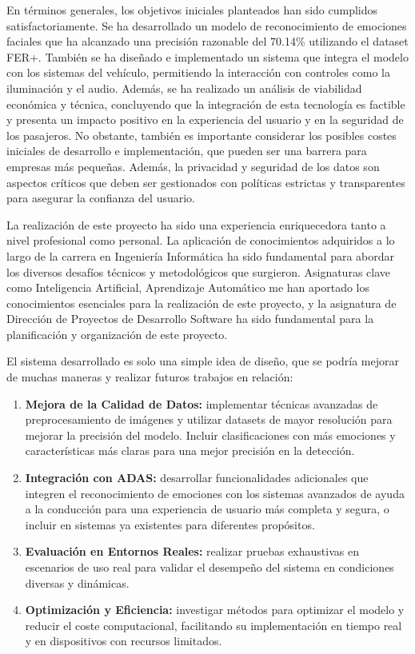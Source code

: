 \documentclass[12pt]{report} %
\begin{document}
En términos generales, los objetivos iniciales planteados han sido cumplidos satisfactoriamente. Se ha desarrollado un modelo de reconocimiento de emociones faciales que ha alcanzado una precisión razonable del 70.14\% utilizando el dataset FER+. También se ha diseñado e implementado un sistema que integra el modelo con los sistemas del vehículo, permitiendo la interacción con controles como la iluminación y el audio. Además, se ha realizado un análisis de viabilidad económica y técnica, concluyendo que la integración de esta tecnología es factible y presenta un impacto positivo en la experiencia del usuario y en la seguridad de los pasajeros. No obstante, también es importante considerar los posibles costes iniciales de desarrollo e implementación, que pueden ser una barrera para empresas más pequeñas. Además, la privacidad y seguridad de los datos son aspectos críticos que deben ser gestionados con políticas estrictas y transparentes para asegurar la confianza del usuario.

La realización de este proyecto ha sido una experiencia enriquecedora tanto a nivel profesional como personal. La aplicación de conocimientos adquiridos a lo largo de la carrera en Ingeniería Informática ha sido fundamental para abordar los diversos desafíos técnicos y metodológicos que surgieron. Asignaturas clave como Inteligencia Artificial, Aprendizaje Automático me han aportado los conocimientos esenciales para la realización de este proyecto, y la asignatura de Dirección de Proyectos de Desarrollo Software ha sido fundamental para la planificación y organización de este proyecto.

El sistema desarrollado es solo una simple idea de diseño, que se podría mejorar de muchas maneras y realizar futuros trabajos en relación:

\begin{enumerate}

    \item \textbf{Mejora de la Calidad de Datos:} implementar técnicas avanzadas de preprocesamiento de imágenes y utilizar datasets de mayor resolución para mejorar la precisión del modelo. Incluir clasificaciones con más emociones y características más claras para una mejor precisión en la detección.
    \item \textbf{Integración con ADAS:} desarrollar funcionalidades adicionales que integren el reconocimiento de emociones con los sistemas avanzados de ayuda a la conducción para una experiencia de usuario más completa y segura, o incluir en sistemas ya existentes para diferentes propósitos.
    \item \textbf{Evaluación en Entornos Reales:} realizar pruebas exhaustivas en escenarios de uso real para validar el desempeño del sistema en condiciones diversas y dinámicas.
    \item \textbf{Optimización y Eficiencia:} investigar métodos para optimizar el modelo y reducir el coste computacional, facilitando su implementación en tiempo real y en dispositivos con recursos limitados.

\end{enumerate}
\end{document}
